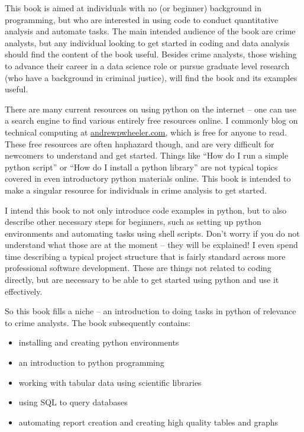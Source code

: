 \documentclass[
  letterpaper,
]{scrbook}
\providecommand{\tightlist}{%
  \setlength{\itemsep}{0pt}\setlength{\parskip}{0pt}}\usepackage{longtable,booktabs,array}
\begin{document}

This book is aimed at individuals with no (or beginner) background in
programming, but who are interested in using code to conduct
quantitative analysis and automate tasks. The main intended audience of
the book are crime analysts, but any individual looking to get started
in coding and data analysis should find the content of the book useful.
Besides crime analysts, those wishing to advance their career in a data
science role or pursue graduate level research (who have a background in
criminal justice), will find the book and its examples useful.

There are many current resources on using python on the internet -- one
can use a search engine to find various entirely free resources online.
I commonly blog on technical computing at
\href{https://andrewpwheeler.com/}{andrewpwheeler.com}, which is free
for anyone to read. These free resources are often haphazard though, and
are very difficult for newcomers to understand and get started. Things
like ``How do I run a simple python script'' or ``How do I install a
python library'' are not typical topics covered in even introductory
python materials online. This book is intended to make a singular
resource for individuals in crime analysis to get started.

I intend this book to not only introduce code examples in python, but to
also describe other necessary steps for beginners, such as setting up
python environments and automating tasks using shell scripts. Don't
worry if you do not understand what those are at the moment -- they will
be explained! I even spend time describing a typical project structure
that is fairly standard across more professional software development.
These are things not related to coding directly, but are necessary to be
able to get started using python and use it effectively.

So this book fills a niche -- an introduction to doing tasks in python
of relevance to crime analysts. The book subsequently contains:

\begin{itemize}
\tightlist
\item
  installing and creating python environments
\item
  an introduction to python programming
\item
  working with tabular data using scientific libraries
\item
  using SQL to query databases
\item
  automating report creation and creating high quality tables and graphs
\end{itemize}
\end{document}
